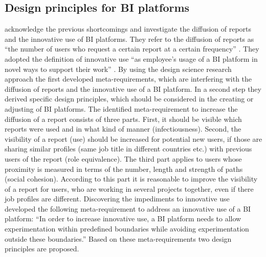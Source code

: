\subsection{Design principles for BI platforms}
\label{design_principles}
\citet{kretzer_designer_2015} acknowledge the previous shortcomings and investigate the diffusion of reports and the innovative use of BI platforms. They refer to the diffusion of reports as ``the number of users who request a certain report at a certain frequency'' \citep[p.677]{kretzer_designer_2015}. They adopted the definition of innovative use ``as employee's usage of a BI platform in novel ways to support their work'' \citep[cited in][p.677]{kretzer_designer_2015}. By using the design science research approach the first developed meta-requirements, which are interfering with the diffusion of reports and the innovative use of a BI platform. In a second step they derived specific design principles, which should be considered in the creating or adjusting of BI platforms.
\newline\newline
The identified meta-requirement to increase the diffusion of a report consists of three parts.\citep[cf.][p.680f.]{kretzer_designer_2015} First, it should be visible which reports were used and in what kind of manner (infectiousness). Second, the visibility of a report (use) should be increased for potential new users, if those are sharing similar profiles (same job title in different countries etc.) with previous users of the report (role equivalence). The third part applies to users whose proximity is measured in terms of the number, length and strength of paths (social cohesion). According to this part it is reasonable to improve the visibility of a report for users, who are working in several projects together, even if there job profiles are different.
\newline\newline
Discovering the impediments to innovative use \citet{kretzer_designer_2015} developed the following meta-requirement to address an innovative use of a BI platform: ``In order to increase innovative use, a BI platform needs to allow experimentation within predefined boundaries while avoiding experimentation outside these boundaries.''\citep[p.681]{kretzer_designer_2015} 
\newline\newline
Based on these meta-requirements two design principles are proposed.
